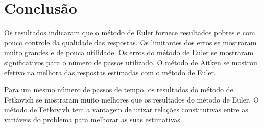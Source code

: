 \documentclass[final,3p]{elsarticle}
\numberwithin{equation}{section}
\begin{document}
    \section{Conclusão}

        Os resultados indicaram que o método de Euler fornece resultados pobres e com pouco controle da qualidade das respostas. Os limitantes dos erros se mostraram muito grandes e de pouca utilidade. Os erros do método de Euler se mostraram significativos para o número de passos utilizado. O método de Aitken se mostrou efetivo na melhora das respostas estimadas com o método de Euler.

        Para um mesmo número de passos de tempo, os resultados do método de Fetkovich se mostraram muito melhores que os resultados do método de Euler. O método de Fetkovivh tem a vantagem de utizar relações constitutivas entre as variáveis do problema para melhorar as suas estimativas.



\appendix












\end{document}
